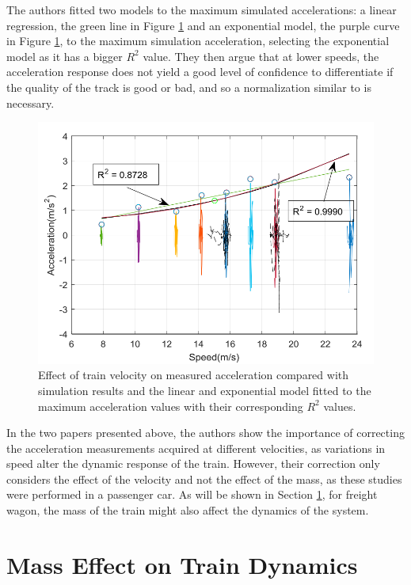 The authors fitted two models to the maximum simulated accelerations: a linear regression, the green line in Figure \ref{fig:vel_effect_balouchi} and an exponential model, the purple curve in Figure \ref{fig:vel_effect_balouchi}, to the maximum simulation acceleration, selecting the exponential model as it has a bigger $R^2$ value. They then argue that at lower speeds, the acceleration response does not yield a good level of confidence to differentiate if the quality of the track is good or bad, and so a normalization similar to \cite{Hironori_ONO202322-00239} is necessary.

\begin{figure}[H]
    \centering
    \includegraphics[width=12cm]{Cap2_LitReview/Vel_effect/results_bia.png}
    \caption{Effect of train velocity on measured acceleration compared with simulation results and the linear and exponential model fitted to the maximum acceleration values with their corresponding $R^2$ values. \cite{Balouchi02092021}}
    \label{fig:vel_effect_balouchi}
\end{figure}

In the two papers presented above, the authors show the importance of correcting the acceleration measurements acquired at different velocities, as variations in speed alter the dynamic response of the train. However, their correction only considers the effect of the velocity and not the effect of the mass, as these studies were performed in a passenger car. As will be shown in Section \ref{sec-mass-effect-measurement}, for freight wagon, the mass of the train might also affect the dynamics of the system.

\section{Mass Effect on Train Dynamics} \label{sec-mass-effect-measurement}

